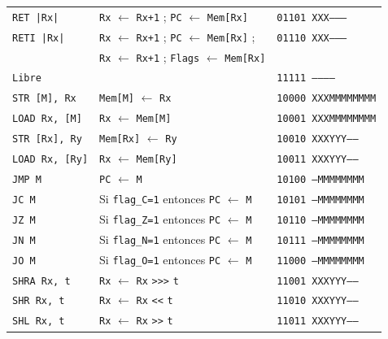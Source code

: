 \documentclass[a4paper,11pt]{article}
\begin{document}
\begin{center}
\begin{tabular}{l|l|l}
\texttt{RET  |Rx|}     & \texttt{Rx} $\leftarrow$ \texttt{Rx+1} ; \texttt{PC} $\leftarrow$ \texttt{Mem[Rx]}    & \texttt{01101 XXX--------} \\  %
\texttt{RETI |Rx|}     & \texttt{Rx} $\leftarrow$ \texttt{Rx+1} ; \texttt{PC} $\leftarrow$ \texttt{Mem[Rx]} ;  & \texttt{01110 XXX--------} \\  %
                       & \texttt{Rx} $\leftarrow$ \texttt{Rx+1} ; \texttt{Flags} $\leftarrow$ \texttt{Mem[Rx]} & \\
\hline
\texttt{Libre}         &                                                                    & \texttt{11111 -----------} \\  %
\hline
\texttt{STR  [M], Rx}  & \texttt{Mem[M]} $\leftarrow$ \texttt{Rx}                           & \texttt{10000 XXXMMMMMMMM} \\  %
\texttt{LOAD Rx, [M]}  & \texttt{Rx} $\leftarrow$ \texttt{Mem[M]}                           & \texttt{10001 XXXMMMMMMMM} \\  %
\texttt{STR  [Rx], Ry} & \texttt{Mem[Rx]} $\leftarrow$ \texttt{Ry}                          & \texttt{10010 XXXYYY-----} \\  %
\texttt{LOAD Rx, [Ry]} & \texttt{Rx} $\leftarrow$ \texttt{Mem[Ry]}                          & \texttt{10011 XXXYYY-----} \\  %
\hline
\texttt{JMP M}         & \texttt{PC} $\leftarrow$ \texttt{M}                                & \texttt{10100 ---MMMMMMMM} \\  %
\texttt{JC M}          & Si \texttt{flag\_C=1} entonces \texttt{PC} $\leftarrow$ \texttt{M} & \texttt{10101 ---MMMMMMMM} \\  %
\texttt{JZ M}          & Si \texttt{flag\_Z=1} entonces \texttt{PC} $\leftarrow$ \texttt{M} & \texttt{10110 ---MMMMMMMM} \\  %
\texttt{JN M}          & Si \texttt{flag\_N=1} entonces \texttt{PC} $\leftarrow$ \texttt{M} & \texttt{10111 ---MMMMMMMM} \\  %
\texttt{JO M}          & Si \texttt{flag\_O=1} entonces \texttt{PC} $\leftarrow$ \texttt{M} & \texttt{11000 ---MMMMMMMM} \\  %
\hline
\texttt{SHRA Rx, t}    & \texttt{Rx} $\leftarrow$ \texttt{Rx} \verb|>>>| \texttt{t}         & \texttt{11001 XXXYYY-----} \\  %
\texttt{SHR Rx, t}     & \texttt{Rx} $\leftarrow$ \texttt{Rx} \verb|<<| \texttt{t}          & \texttt{11010 XXXYYY-----} \\  %
\texttt{SHL Rx, t}     & \texttt{Rx} $\leftarrow$ \texttt{Rx} \verb|>>| \texttt{t}          & \texttt{11011 XXXYYY-----} \\  %

\end{tabular}
\end{center}
\end{document}
